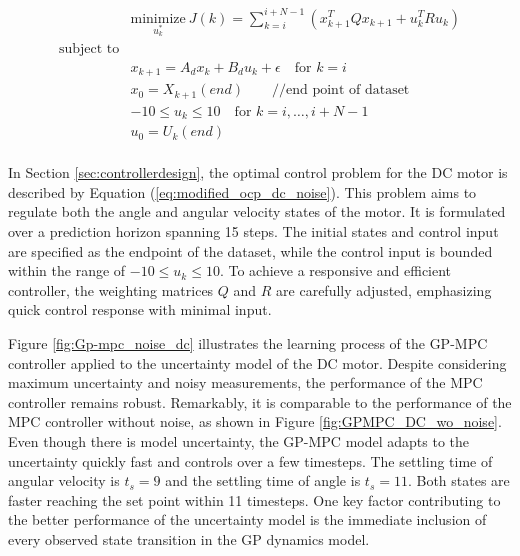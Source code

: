 \begin{equation} \label{eq:modified_ocp_dc_noise}
    \begin{aligned}
 & \underset{u^*_k}{\text{minimize}} \ J(k) = \sum_{k=i}^{i+N-1}( x_{k+1}^T Q x_{k+1} + u_k^T R u_k )  \\
 \text{subject to}\\
& x_{k+1} =  A_d x_k + B_d u_k + \epsilon  \quad \text{for } k=i \\
& x_0 = X_{k+1}(end) \qquad  \text{//end point of dataset} \\
& -10 \leq u_k \leq 10 \quad \text{for } k=i,\ldots,i+N-1 \\
& u_0 = U_k(end) \\
\end{aligned}
\end{equation}

In Section \ref{sec:controllerdesign}, the optimal control problem for the DC motor is described by Equation (\ref{eq:modified_ocp_dc_noise}). This problem aims to regulate both the angle and angular velocity states of the motor. It is formulated over a prediction horizon spanning 15 steps. The initial states and control input are specified as the endpoint of the dataset, while the control input is bounded within the range of $-10 \leq u_k \leq 10$. To achieve a responsive and efficient controller, the weighting matrices $Q$ and $R$ are carefully adjusted, emphasizing quick control response with minimal input.


Figure \ref{fig:Gp-mpc_noise_dc} illustrates the learning process of the GP-MPC controller applied to the uncertainty model of the DC motor. Despite considering maximum uncertainty and noisy measurements, the performance of the MPC controller remains robust. Remarkably, it is comparable to the performance of the MPC controller without noise, as shown in Figure \ref{fig:GPMPC_DC_wo_noise}. Even though there is model uncertainty, the GP-MPC model adapts to the uncertainty quickly fast and controls over a few timesteps. The settling time of angular velocity is $t_s=9$ and the settling time of angle is $t_s=11$. Both states are faster reaching the set point within 11 timesteps. One key factor contributing to the better performance of the uncertainty model is the immediate inclusion of every observed state transition in the GP dynamics model.





